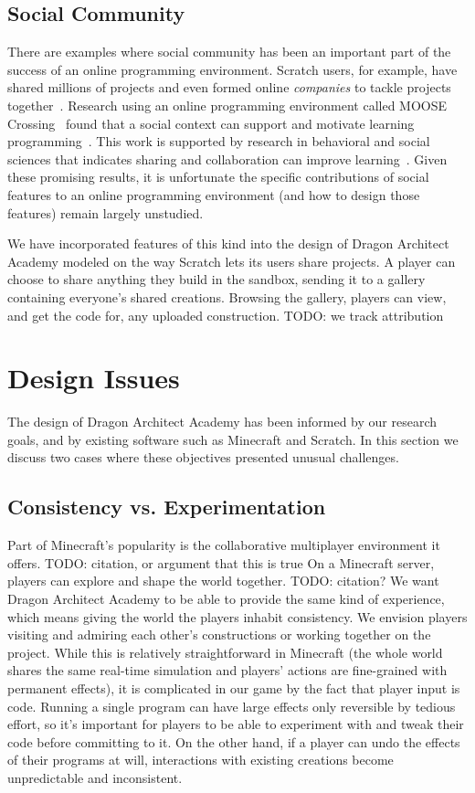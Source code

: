 \documentclass{sig-alternate}
\newcommand{\TODO}[1]{{\color{red} TODO: #1}}
\newcommand{\gametitle}{{\color{RoyalPurple} Dragon Architect Academy}}
\begin{document}
\subsection{Social Community}
There are examples where social community has been an important part of the success of an online programming environment. 
Scratch users, for example, have shared millions of projects and even formed online \emph{companies} to tackle projects together~\cite{resnick2009scratch}. 
Research using an online programming environment called MOOSE Crossing~\cite{bruckman1997moose} found that a social context can support and motivate learning programming~\cite{bruckman2000situated}.
This work is supported by research in behavioral and social sciences that indicates sharing and collaboration can improve learning~\cite{bransford2000people}. 
Given these promising results, it is unfortunate the specific contributions of social features to an online programming environment (and how to design those features) remain largely unstudied.

We have incorporated features of this kind into the design of \gametitle{} modeled on the way Scratch lets its users share projects. 
A player can choose to share anything they build in the sandbox, sending it to a gallery containing everyone's shared creations.
Browsing the gallery, players can view, and get the code for, any uploaded construction.
\TODO{we track attribution}

\section{Design Issues}
The design of \gametitle{} has been informed by our research goals, and by existing software such as Minecraft and Scratch. 
In this section we discuss two cases where these objectives presented unusual challenges. 

\subsection{Consistency vs. Experimentation}
Part of Minecraft's popularity is the collaborative multiplayer environment it offers. \TODO{citation, or argument that this is true}
On a Minecraft server, players can explore and shape the world together. \TODO{citation?} 
We want \gametitle{} to be able to provide the same kind of experience, which means giving the world the players inhabit consistency. 
We envision players visiting and admiring each other's constructions or working together on the project. 
While this is relatively straightforward in Minecraft (the whole world shares the same real-time simulation and players' actions are fine-grained with permanent effects), it is complicated in our game by the fact that player input is code. 
Running a single program can have large effects only reversible by tedious effort, so it's important for players to be able to experiment with and tweak their code before committing to it. 
On the other hand, if a player can undo the effects of their programs at will, interactions with existing creations become unpredictable and inconsistent. 
\end{document}
